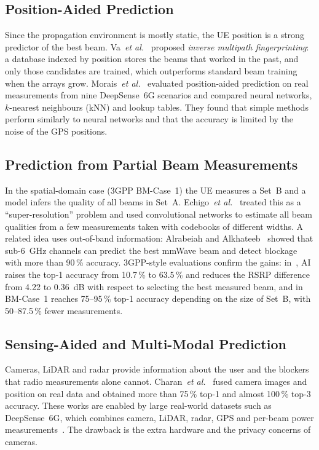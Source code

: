 \documentclass[journal]{IEEEtran}
\begin{document}
\subsection{Position-Aided Prediction}
Since the propagation environment is mostly static, the UE position is a strong predictor of the best beam. Va~\emph{et al.}~\cite{va2018inverse} proposed \emph{inverse multipath fingerprinting}: a database indexed by position stores the beams that worked in the past, and only those candidates are trained, which outperforms standard beam training when the arrays grow. Morais~\emph{et al.}~\cite{morais2023position} evaluated position-aided prediction on real measurements from nine DeepSense~6G scenarios and compared neural networks, $k$-nearest neighbours (kNN) and lookup tables. They found that simple methods perform similarly to neural networks and that the accuracy is limited by the noise of the GPS positions.

\subsection{Prediction from Partial Beam Measurements}
In the spatial-domain case (3GPP BM-Case~1) the UE measures a Set~B and a model infers the quality of all beams in Set~A. Echigo~\emph{et al.}~\cite{echigo2021low} treated this as a ``super-resolution'' problem and used convolutional networks to estimate all beam qualities from a few measurements taken with codebooks of different widths. A related idea uses out-of-band information: Alrabeiah and Alkhateeb~\cite{alrabeiah2020sub6} showed that sub-6~GHz channels can predict the best mmWave beam and detect blockage with more than 90\,\% accuracy. 3GPP-style evaluations confirm the gains: in~\cite{xue2023standard}, AI raises the top-1 accuracy from 10.7\,\% to 63.5\,\% and reduces the RSRP difference from 4.22 to 0.36~dB with respect to selecting the best measured beam, and in~\cite{jayaweera2024bm} BM-Case~1 reaches 75--95\,\% top-1 accuracy depending on the size of Set~B, with 50--87.5\,\% fewer measurements.

\subsection{Sensing-Aided and Multi-Modal Prediction}
Cameras, LiDAR and radar provide information about the user and the blockers that radio measurements alone cannot. Charan~\emph{et al.}~\cite{charan2022vision} fused camera images and position on real data and obtained more than 75\,\% top-1 and almost 100\,\% top-3 accuracy. These works are enabled by large real-world datasets such as DeepSense~6G, which combines camera, LiDAR, radar, GPS and per-beam power measurements~\cite{alkhateeb2023deepsense}. The drawback is the extra hardware and the privacy concerns of cameras.
\end{document}
